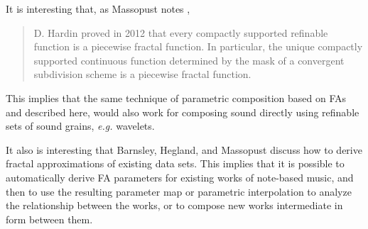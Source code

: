 \documentclass[english,11pt,letterpaper,onecolumn]{scrartcl}
\numberwithin{equation}{section}
\begin{document}
    It is interesting that, as Massopust notes \cite{massopust2017}, 
    \begin{quote}D. Hardin proved in 2012 that every compactly supported 
        refinable function is a piecewise fractal function. In particular, the unique 
        compactly supported continuous function determined by the mask of a convergent 
        subdivision scheme is a piecewise fractal function. \end{quote} 
    This implies that the same technique of parametric 
    composition based on FAs and described here, would also work for composing 
    sound directly using refinable sets of sound grains, \textit{e.g.} wavelets.
    
    It also is interesting that Barnsley, Hegland, and Massopust 
    \cite{2013arXiv1309.0972B} discuss how to derive fractal approximations of 
    existing data sets. This implies that it is possible to automatically derive 
    FA parameters for existing works of note-based music, and then to use the 
    resulting parameter map or parametric interpolation to analyze the 
    relationship between the works, or to compose new works intermediate in form 
    between them.
    
    \printbibliography
    
\end{document}
